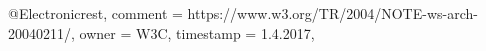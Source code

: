 @Electronic{rest,
	comment   = {https://www.w3.org/TR/2004/NOTE-ws-arch-20040211/},
	owner     = {W3C},
	timestamp = {1.4.2017},
}
